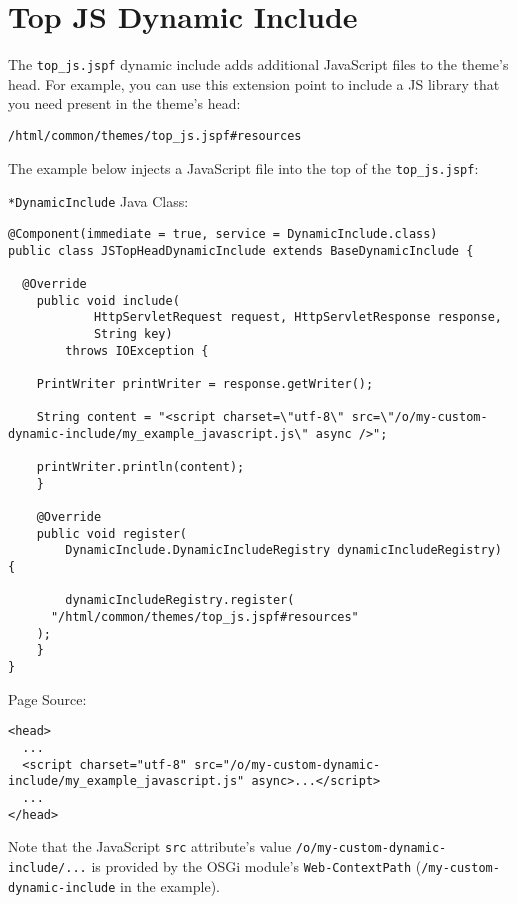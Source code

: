 \chapter{Top JS Dynamic Include}\label{top-js-dynamic-include}

The \texttt{top\_js.jspf} dynamic include adds additional JavaScript
files to the theme's head. For example, you can use this extension point
to include a JS library that you need present in the theme's head:

\begin{verbatim}
/html/common/themes/top_js.jspf#resources
\end{verbatim}

The example below injects a JavaScript file into the top of the
\texttt{top\_js.jspf}:

\texttt{*DynamicInclude} Java Class:

\begin{verbatim}
@Component(immediate = true, service = DynamicInclude.class)
public class JSTopHeadDynamicInclude extends BaseDynamicInclude {

  @Override
    public void include(
            HttpServletRequest request, HttpServletResponse response,
            String key)
        throws IOException {

    PrintWriter printWriter = response.getWriter();

    String content = "<script charset=\"utf-8\" src=\"/o/my-custom-dynamic-include/my_example_javascript.js\" async />";

    printWriter.println(content);
    }

    @Override
    public void register(
        DynamicInclude.DynamicIncludeRegistry dynamicIncludeRegistry) {

        dynamicIncludeRegistry.register(
      "/html/common/themes/top_js.jspf#resources"
    );
    }
}
\end{verbatim}

Page Source:

\begin{verbatim}
<head>
  ...
  <script charset="utf-8" src="/o/my-custom-dynamic-include/my_example_javascript.js" async>...</script>
  ...
</head>
\end{verbatim}

Note that the JavaScript \texttt{src} attribute's value
\texttt{/o/my-custom-dynamic-include/...} is provided by the OSGi
module's \texttt{Web-ContextPath} (\texttt{/my-custom-dynamic-include}
in the example).

